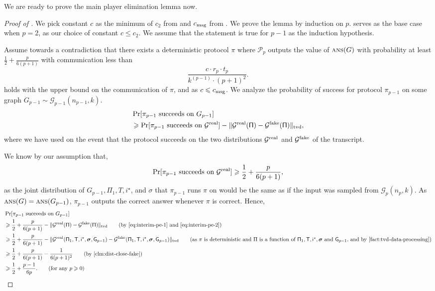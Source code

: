 \documentclass[11pt]{article}
\theoremstyle{definition}
\renewcommand{\leq}{\leqslant}
\renewcommand{\geq}{\geqslant}
\newcommand{\tvd}[2]{\ensuremath{\norm{#1 - #2}_{\mathrm{tvd}}}}
\newcommand{\norm}[1]{\ensuremath{\|#1\|}}
\DeclareMathOperator*{\Prob}{\ensuremath{\textnormal{Pr}}}
\renewcommand{\Pr}{\Prob}
\newcommand{\rv}[1]{\ensuremath{{\mathsf{#1}}}\xspace}
\newcommand{\player}[1]{\ensuremath{\mathcal{P}_{#1}}}
\newcommand{\cG}{\ensuremath{\mathcal{G}}}
\newcommand{\ans}{\ensuremath{\textnormal{\textsc{ans}}}}
\newcommand{\istar}{\ensuremath{i^{\star}}}
\newcommand{\prot}{\ensuremath{\pi}}
\newcommand{\Prot}{\ensuremath{\Pi}}
\newcommand{\rProt}{\ensuremath{\rv{\Prot}}}
\newcommand{\rT}{\ensuremath{\rv{T}}}
\newcommand{\rsigma}{\ensuremath{\bm{\sigma}}}
\begin{document}
	We are ready to prove the main player elimination lemma now.
	
	\begin{proof}[Proof of ]
		We pick constant $c$ as the minimum of $c_2 $ from  and $c_{\textnormal{msg}}$ from .
		We prove the lemma by induction on $p$.  serves as the base case when $p = 2$, as our choice of constant $c \leq c_2$. We assume that the statement is true for $p-1$ as the induction hypothesis. 
		
		Assume towards a contradiction that there exists a deterministic protocol $\prot$ where $\player{p}$ outputs the value of $\ans(G)$ with probability at least $\frac12 + \frac{p}{6(p+1)}$ with communication less than
		\[
			 \frac{c \cdot r_p \cdot t_p}{k^{(p-1)} \cdot (p+1)^2}. 
		\]
		 holds with the upper bound on the communication of $\prot$, and as $c \leq \cmsg$. 
		We analyze the probability of success for protocol $\prot_{p-1}$ on some graph $G_{p-1} \sim \cG_{p-1}(n_{p-1}, k)$. 
		\begin{align}
			&\Pr[\prot_{p-1} \textnormal{ succeeds on $G_{p-1}$}] \notag\\
			&\geq \Pr[\prot_{p-1} \textnormal{ succeeds on $\cGreal$}] - \tvd{\cGreal(\rProt)}{\cGfake(\rProt)}, \label{eq:interim-pe-1}
		\end{align}
		where we have used  on the event that the protocol succeeds on the two distributions $\mathcal{G}^{\textnormal{real}}$ and $\mathcal{G}^{\textnormal{fake}} $ of the transcript. 
		
		We know by our assumption that, 
		\begin{equation}\label{eq:interim-pe-2}
		 \Pr[\prot_{p-1} \textnormal{ succeeds on $\cGreal$}]  \geq \frac12 + \frac{p}{6(p+1)},
		\end{equation}
		as the joint distribution of $G_{p-1}, \Prot_1, T, \istar$, and $ \sigma$ that $\prot_{p-1}$ runs $\prot$ on would be the same as if the input was sampled from  $\cG_p(n_p,k)$. As $\ans(G) = \ans(G_{p-1})$, $\prot_{p-1}$ outputs the correct answer whenever $\prot$ is correct. 
		Hence,
		\begin{align*}
				&\Pr[\prot_{p-1} \textnormal{ succeeds on $G_{p-1}$}] \\ 
				&\geq \frac12 + \frac{p}{6(p+1)} -  \tvd{\cGreal(\rProt)}{\cGfake(\rProt)} \tag{by \Cref{eq:interim-pe-1} and \Cref{eq:interim-pe-2}} \\
				&\geq  \frac12 + \frac{p}{6(p+1)} -  \tvd{\cGreal(\rProt_1, \rT, \ristar, \rsigma, \rG_{p-1})}{\cGfake(\rProt_1, \rT, \ristar, \rsigma, \rG_{p-1})} \tag{as $\prot$ is deterministic and $\Prot$ is a function of $\rProt_1, \rT, \ristar, \rsigma$ and $\rG_{p-1}$, and by \Cref{fact:tvd-data-processing}} \\
				&\geq    \frac12 +  \frac{p}{6(p+1)} - \frac1{6(p+1)^2} \tag{by \Cref{clm:dist-close-fake}}\\
				&\geq \frac12 + \frac{p-1}{6p}. \tag{for any $p \geq 0$}
		\end{align*}


\end{proof}
\end{document}
